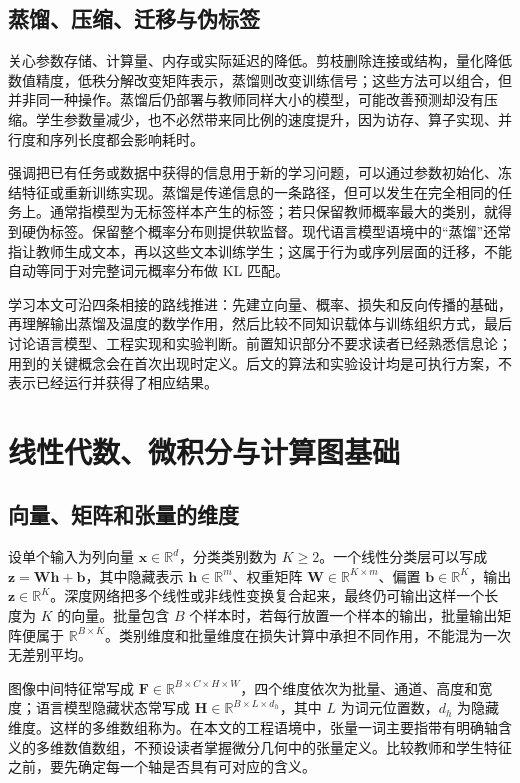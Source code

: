 \documentclass[UTF8,12pt,a4paper,fontset=fandol]{ctexart}
\begin{document}
\subsection{蒸馏、压缩、迁移与伪标签}
关心参数存储、计算量、内存或实际延迟的降低。剪枝删除连接或结构，量化降低数值精度，低秩分解改变矩阵表示，蒸馏则改变训练信号；这些方法可以组合，但并非同一种操作。蒸馏后仍部署与教师同样大小的模型，可能改善预测却没有压缩。学生参数量减少，也不必然带来同比例的速度提升，因为访存、算子实现、并行度和序列长度都会影响耗时。

强调把已有任务或数据中获得的信息用于新的学习问题，可以通过参数初始化、冻结特征或重新训练实现。蒸馏是传递信息的一条路径，但可以发生在完全相同的任务上。通常指模型为无标签样本产生的标签；若只保留教师概率最大的类别，就得到硬伪标签。保留整个概率分布则提供软监督。现代语言模型语境中的“蒸馏”还常指让教师生成文本，再以这些文本训练学生；这属于行为或序列层面的迁移，不能自动等同于对完整词元概率分布做 KL 匹配。

学习本文可沿四条相接的路线推进：先建立向量、概率、损失和反向传播的基础，再理解输出蒸馏及温度的数学作用，然后比较不同知识载体与训练组织方式，最后讨论语言模型、工程实现和实验判断。前置知识部分不要求读者已经熟悉信息论；用到的关键概念会在首次出现时定义。后文的算法和实验设计均是可执行方案，不表示已经运行并获得了相应结果。

\section{线性代数、微积分与计算图基础}
\label{sec:kd-mathematics}

\subsection{向量、矩阵和张量的维度}
设单个输入为列向量 $\mathbf x\in\mathbb R^d$，分类类别数为 $K\geq2$。一个线性分类层可以写成 $\mathbf z=\mathbf W\mathbf h+\mathbf b$，其中隐藏表示 $\mathbf h\in\mathbb R^m$、权重矩阵 $\mathbf W\in\mathbb R^{K\times m}$、偏置 $\mathbf b\in\mathbb R^K$，输出 $\mathbf z\in\mathbb R^K$。深度网络把多个线性或非线性变换复合起来，最终仍可输出这样一个长度为 $K$ 的向量。批量包含 $B$ 个样本时，若每行放置一个样本的输出，批量输出矩阵便属于 $\mathbb R^{B\times K}$。类别维度和批量维度在损失计算中承担不同作用，不能混为一次无差别平均。

图像中间特征常写成 $\mathbf F\in\mathbb R^{B\times C\times H\times W}$，四个维度依次为批量、通道、高度和宽度；语言模型隐藏状态常写成 $\mathbf H\in\mathbb R^{B\times L\times d_h}$，其中 $L$ 为词元位置数，$d_h$ 为隐藏维度。这样的多维数组称为。在本文的工程语境中，张量一词主要指带有明确轴含义的多维数值数组，不预设读者掌握微分几何中的张量定义。比较教师和学生特征之前，要先确定每一个轴是否具有可对应的含义。
\end{document}
